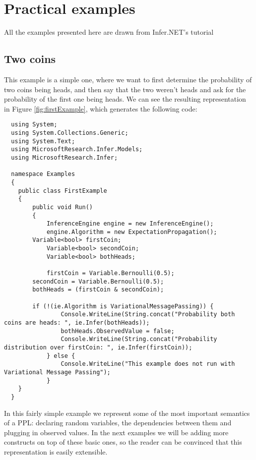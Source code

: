 \chapter{Practical examples}\label{chap:chap4}

All the examples presented here are drawn from Infer.NET's tutorial
\cite{InferNET14t}

\section{Two coins}

This example is a simple one, where we want to first determine the probability of
two coins being heads, and then say that the two weren't heads and ask for the
probability of the first one being heads.
We can see the resulting representation in Figure \ref{fig:firstExample}, which generates the following code:

\begin{lstlisting}
  using System;
  using System.Collections.Generic;
  using System.Text;
  using MicrosoftResearch.Infer.Models;
  using MicrosoftResearch.Infer;

  namespace Examples
  {
  	public class FirstExample
  	{
  		public void Run()
  		{
  			InferenceEngine engine = new InferenceEngine();
  			engine.Algorithm = new ExpectationPropagation();
        Variable<bool> firstCoin;
  			Variable<bool> secondCoin;
  			Variable<bool> bothHeads;

  			firstCoin = Variable.Bernoulli(0.5);
        secondCoin = Variable.Bernoulli(0.5);
        bothHeads = (firstCoin & secondCoin);

        if (!(ie.Algorithm is VariationalMessagePassing)) {
  				Console.WriteLine(String.concat("Probability both coins are heads: ", ie.Infer(bothHeads));
  				bothHeads.ObservedValue = false;
  				Console.WriteLine(String.concat("Probability distribution over firstCoin: ", ie.Infer(firstCoin));
  			} else {
  				Console.WriteLine("This example does not run with Variational Message Passing");
    		}
  	}
  }
\end{lstlisting}

In this fairly simple example we represent some of the most important semantics
of a PPL: declaring random variables, the dependencies between them and plugging
in observed values. In the next examples we will be adding more constructs on
top of these basic ones, so the reader can be convinced that this representation
is easily extensible.

